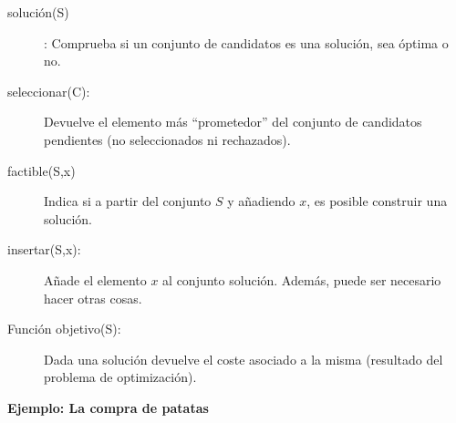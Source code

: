 \documentclass[10pt,a4paper,spanish]{report}
\theoremstyle{definition}
\theoremstyle{remark}
\begin{document}
\begin{description}
    \item[solución(S)]: Comprueba si un conjunto de candidatos es una solución, sea óptima o no.
    \item[seleccionar(C):] Devuelve el elemento más ``prometedor'' del conjunto de candidatos pendientes (no seleccionados ni rechazados).
    \item[factible(S,x)]  Indica si a partir del conjunto $S$ y añadiendo $x$, es posible construir una solución.
    \item[insertar(S,x):] Añade el elemento $x$ al conjunto solución. Además, puede ser necesario hacer otras cosas.
    \item[Función objetivo(S):] Dada una solución devuelve el coste asociado a la misma (resultado del problema de optimización).
\end{description}

\textbf{\textcolor{electriccrimson}{Ejemplo}: La compra de patatas}
\end{document}
